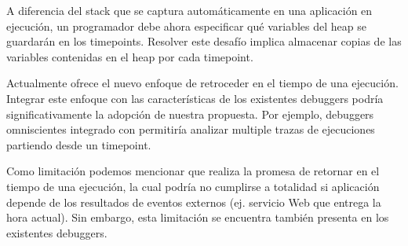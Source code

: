 \documentclass[conference]{IEEEtran}
\begin{document}
\smallskip

 A diferencia del stack que se captura autom\'aticamente en una aplicaci\'on en ejecuci\'on, un programador debe ahora especificar qu\'e variables del heap se guardar\'an en los timepoints. Resolver este desaf\'io implica almacenar copias de las variables contenidas en el heap por cada timepoint.      

\smallskip

 Actualmente \deloreanjs ofrece el nuevo enfoque de retroceder en el tiempo de una ejecuci\'on. Integrar este enfoque con las caracter\'isticas de los existentes debuggers podr\'ia significativamente la adopci\'on de nuestra propuesta. Por ejemplo, debuggers omniscientes integrado con \deloreanjs permitir\'ia analizar multiple trazas de ejecuciones partiendo desde un timepoint.

\smallskip

Como limitaci\'on podemos mencionar que \deloreanjs realiza la promesa de retornar en el tiempo de una ejecuci\'on, la cual podr\'ia no cumplirse a totalidad si aplicaci\'on depende de los resultados de eventos externos (ej. servicio Web que entrega la hora actual). Sin embargo, esta limitaci\'on se encuentra tambi\'en presenta en los existentes debuggers.               



\end{document}
